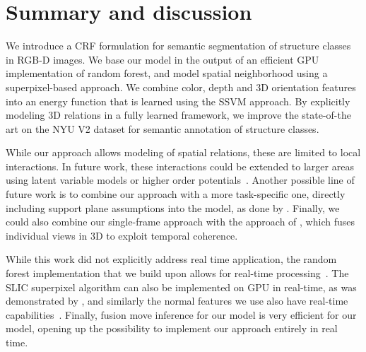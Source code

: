 \section{Summary and discussion}
We introduce a CRF formulation for semantic segmentation
of structure classes in RGB-D images. We base our model in the output of an efficient GPU implementation
of random forest, and model spatial neighborhood using a superpixel-based approach.
We combine color, depth and 3D orientation features into an energy function
that is learned using the SSVM approach. By explicitly modeling 3D relations in
a fully learned framework, we improve the state-of-the art on the NYU V2
dataset for semantic annotation of structure classes.


While our approach allows modeling of spatial relations, these are limited to
local interactions. In future work, these interactions could be extended to
larger areas using latent variable models or higher
order potentials~\citep{ladicky2009associative}.
Another possible line of future work is to combine our approach with a more
task-specific one, directly including support plane assumptions into the model,
as done by \citet{SilbermanECCV12}. Finally, we could also combine our
single-frame approach with the approach of \citet{stueckler2013}, which fuses
individual views in 3D to exploit temporal coherence.

While this work did not explicitly address real time application, the random
forest implementation that we build upon allows for real-time
processing~\citep{stueckler2013}. The SLIC superpixel algorithm can also be
implemented on GPU in real-time, as was demonstrated by \citep{ren2011gslic}, and similarly
the normal features we use also have
real-time capabilities~\citep{holz_2011_robocup}.
Finally, fusion move inference for our model is very efficient for our model,
opening up the possibility to implement our approach entirely in real time.

